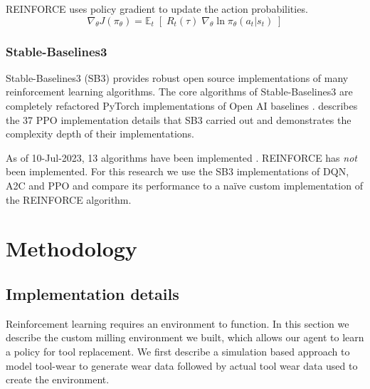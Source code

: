 \documentclass[a4paper, 12pt]{article}
\begin{document}
REINFORCE uses policy gradient to update the action probabilities.
\begin{equation}
	\nabla_ \theta J(\pi_\theta) = \mathbb{E}_t \; [ \; R_t(\tau) \; \nabla_\theta \ln \pi_\theta(a_t \vert s_t) \;]
	\label{eq:REINFORCE}
\end{equation}

\subsubsection*{Stable-Baselines3}
Stable-Baselines3 (SB3) \cite{SB3-paper} provides robust open source implementations of many reinforcement learning algorithms. The core algorithms of Stable-Baselines3 are completely refactored PyTorch implementations of Open AI baselines \citep{OpenAI-baselines}. \cite{SB3-PPO-implementation} describes the 37 PPO implementation details that SB3 carried out and demonstrates the complexity depth of their implementations.

As of 10-Jul-2023, 13 algorithms have been implemented \citep{SB3-algorithms}. REINFORCE has \textit{not} been implemented. For this research we use the SB3 implementations of DQN, A2C and PPO and compare its performance to a na\"ive custom implementation of the REINFORCE algorithm. %

\section{Methodology}\label{sec:Method}
\subsection{Implementation details}\label{sec:Implementation}
Reinforcement learning requires an environment to function. In this section we describe the custom milling environment we built, which allows our agent to learn a policy for tool replacement. We first describe a simulation based approach to model tool-wear to generate wear data followed by actual tool wear data used to create the environment.
\end{document}

